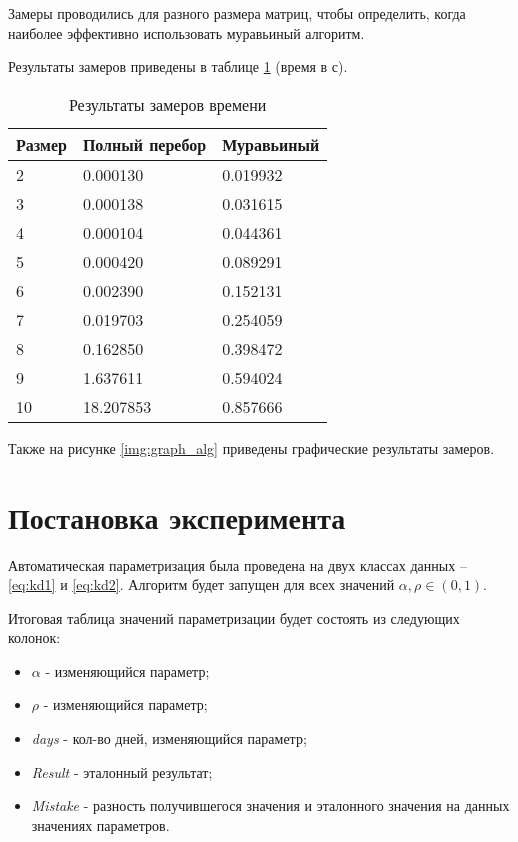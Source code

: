 Замеры проводились для разного размера матриц, чтобы определить, когда наиболее эффективно использовать муравьиный алгоритм.

Результаты замеров приведены в таблице \ref{tbl:time_mes} (время в с).


\begin{center}
\captionsetup{justification=raggedright,singlelinecheck=off}
\begin{longtable}[c]{|p{4cm}|p{4cm}|p{4cm}|}
\caption{Результаты замеров времени\label{tbl:time_mes}}\\ \hline
    Размер & Полный перебор & Муравьиный \\ \hline
    2 &   0.000130 &   0.019932 \\ \hline
    3 &   0.000138 &   0.031615 \\ \hline
    4 &   0.000104 &   0.044361 \\ \hline
    5 &   0.000420 &   0.089291 \\ \hline
    6 &   0.002390 &   0.152131 \\ \hline
    7 &   0.019703 &   0.254059 \\ \hline
    8 &   0.162850 &   0.398472 \\ \hline
    9 &   1.637611 &   0.594024 \\ \hline
    10 &  18.207853 &   0.857666 \\ \hline
\end{longtable}
\end{center}

\clearpage

Также на рисунке \ref{img:graph_alg} приведены графические результаты замеров.


\clearpage


\section{Постановка эксперимента}

Автоматическая параметризация была проведена на двух классах данных -- \ref{eq:kd1} и \ref{eq:kd2}. Алгоритм будет запущен для всех значений $\alpha, \rho \in (0, 1)$.

Итоговая таблица значений параметризации будет состоять из следующих колонок:
\begin{itemize}
    \item $\alpha$ - изменяющийся параметр;
    \item $\rho$ - изменяющийся параметр;
    \item \textit{days} - кол-во дней, изменяющийся параметр;
    \item \textit{Result} - эталонный результат;
    \item \textit{Mistake} - разность получившегося значения и эталонного значения на данных значениях параметров.
\end{itemize}

